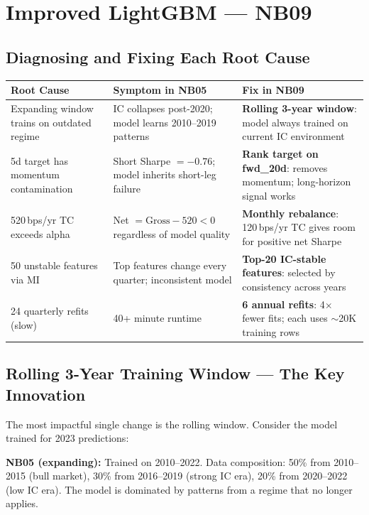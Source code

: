 \documentclass[11pt,a4paper]{article}
\begin{document}
\section{Improved LightGBM --- NB09}

\subsection{Diagnosing and Fixing Each Root Cause}

\begin{center}
\begin{tabular}{p{3.5cm}p{3.5cm}p{5cm}}
\toprule
\textbf{Root Cause} & \textbf{Symptom in NB05} & \textbf{Fix in NB09}\\
\midrule
Expanding window trains on outdated regime & IC collapses post-2020; model learns 2010--2019 patterns & \textbf{Rolling 3-year window}: model always trained on current IC environment\\
5d target has momentum contamination & Short Sharpe $= -0.76$; model inherits short-leg failure & \textbf{Rank target on fwd\_20d}: removes momentum; long-horizon signal works\\
520\,bps/yr TC exceeds alpha & Net $= \text{Gross} - 520 < 0$ regardless of model quality & \textbf{Monthly rebalance}: 120\,bps/yr TC gives room for positive net Sharpe\\
50 unstable features via MI & Top features change every quarter; inconsistent model & \textbf{Top-20 IC-stable features}: selected by consistency across years\\
24 quarterly refits (slow) & 40+ minute runtime & \textbf{6 annual refits}: 4$\times$ fewer fits; each uses $\sim$20K training rows\\
\bottomrule
\end{tabular}
\end{center}

\subsection{Rolling 3-Year Training Window --- The Key Innovation}

The most impactful single change is the rolling window. Consider the model trained for 2023 predictions:

\textbf{NB05 (expanding):} Trained on 2010--2022. Data composition: 50\% from 2010--2015 (bull market), 30\% from 2016--2019 (strong IC era), 20\% from 2020--2022 (low IC era). The model is dominated by patterns from a regime that no longer applies.
\end{document}
